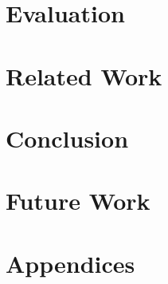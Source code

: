 \documentclass[11pt]{article}
\begin{document}
\section{Evaluation}


\section{Related Work}


\section{Conclusion}


\section{Future Work}


\section{Appendices}

\newpage





\nocite{*}
\end{document}
